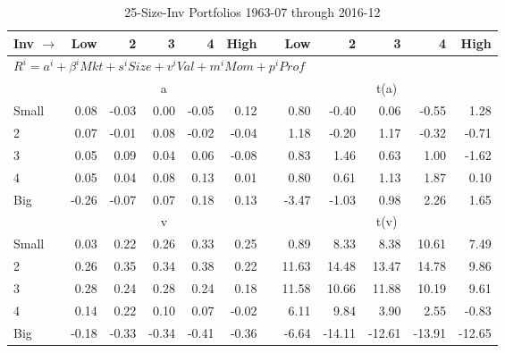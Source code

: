 
\begin{table}[!ht]
\small
\centering
\caption{25-Size-Inv Portfolios 1963-07 through 2016-12}
\begin{tabular}{lrrrrrlrrrrr}
  \toprule
    Inv $\rightarrow$ & Low & 2 & 3 & 4 & High & & Low & 2 & 3 & 4 & High \\ 
  \midrule
  \multicolumn{12}{l}{$R^i=a^i+\beta^iMkt+s^iSize+v^iVal+m^iMom+p^iProf$} \\

  
    
      & \multicolumn{5}{c}{a} & & \multicolumn{5}{c}{t(a)}
    
    \\
      \cmidrule(r){2-6} \cmidrule(r){8-12}

    Small   & 0.08  & -0.03  & 0.00  & -0.05  & 0.12 &  & 0.80  & -0.40  & 0.06  & -0.55  & 1.28  \\
         2  & 0.07  & -0.01  & 0.08  & -0.02  & -0.04 &  & 1.18  & -0.20  & 1.17  & -0.32  & -0.71  \\
         3  & 0.05  & 0.09  & 0.04  & 0.06  & -0.08 &  & 0.83  & 1.46  & 0.63  & 1.00  & -1.62  \\
         4  & 0.05  & 0.04  & 0.08  & 0.13  & 0.01 &  & 0.80  & 0.61  & 1.13  & 1.87  & 0.10  \\
    Big     & -0.26  & -0.07  & 0.07  & 0.18  & 0.13 &  & -3.47  & -1.03  & 0.98  & 2.26  & 1.65  \\

  
    
      & \multicolumn{5}{c}{v} & & \multicolumn{5}{c}{t(v)}
    
    \\
      \cmidrule(r){2-6} \cmidrule(r){8-12}

    Small   & 0.03  & 0.22  & 0.26  & 0.33  & 0.25 &  & 0.89  & 8.33  & 8.38  & 10.61  & 7.49  \\
         2  & 0.26  & 0.35  & 0.34  & 0.38  & 0.22 &  & 11.63  & 14.48  & 13.47  & 14.78  & 9.86  \\
         3  & 0.28  & 0.24  & 0.28  & 0.24  & 0.18 &  & 11.58  & 10.66  & 11.88  & 10.19  & 9.61  \\
         4  & 0.14  & 0.22  & 0.10  & 0.07  & -0.02 &  & 6.11  & 9.84  & 3.90  & 2.55  & -0.83  \\
    Big     & -0.18  & -0.33  & -0.34  & -0.41  & -0.36 &  & -6.64  & -14.11  & -12.61  & -13.91  & -12.65  \\

  
    

\end{tabular}
\end{table}

